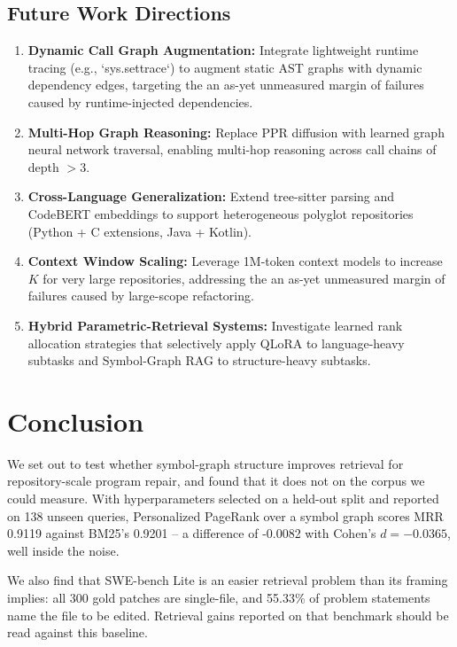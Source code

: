 \documentclass[10pt,twocolumn,letterpaper]{article}
\begin{document}
\subsection{Future Work Directions}


\begin{enumerate}
  \item \textbf{Dynamic Call Graph Augmentation:} Integrate lightweight runtime tracing (e.g., `sys.settrace`) to augment static AST graphs with dynamic dependency edges, targeting the an as-yet unmeasured margin of failures caused by runtime-injected dependencies.
  \item \textbf{Multi-Hop Graph Reasoning:} Replace PPR diffusion with learned graph neural network traversal, enabling multi-hop reasoning across call chains of depth $> 3$.
  \item \textbf{Cross-Language Generalization:} Extend tree-sitter parsing and CodeBERT embeddings to support heterogeneous polyglot repositories (Python + C extensions, Java + Kotlin).
  \item \textbf{Context Window Scaling:} Leverage 1M-token context models to increase $K$ for very large repositories, addressing the an as-yet unmeasured margin of failures caused by large-scope refactoring.
  \item \textbf{Hybrid Parametric-Retrieval Systems:} Investigate learned rank allocation strategies that selectively apply QLoRA to language-heavy subtasks and Symbol-Graph RAG to structure-heavy subtasks.
\end{enumerate}




\section{Conclusion}


We set out to test whether symbol-graph structure improves retrieval for repository-scale program repair, and found that it does not on the corpus we could measure. With hyperparameters selected on a held-out split and reported on 138 unseen queries, Personalized PageRank over a symbol graph scores MRR 0.9119 against BM25's 0.9201 -- a difference of -0.0082 with Cohen's $d = -0.0365$, well inside the noise.

We also find that SWE-bench Lite is an easier retrieval problem than its framing implies: all 300 gold patches are single-file, and 55.33\% of problem statements name the file to be edited. Retrieval gains reported on that benchmark should be read against this baseline.
\end{document}
